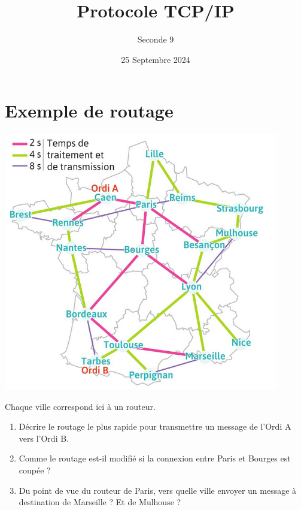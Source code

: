 \documentclass{article}
\title{Protocole TCP/IP}
\date{25 Septembre 2024}
\author{Seconde 9}
\begin{document}
\section*{Exemple de routage}
\begin{center}
\includegraphics[width=0.9\textwidth]{Routage.png}
\end{center}

Chaque ville correspond ici à un routeur.

\begin{enumerate}[label=\emph{\alph*)}]
\item Décrire le routage le plus rapide pour transmettre un message de l'Ordi A vers l'Ordi B.

\emptybox{2cm}
\item Comme le routage est-il modifié si la connexion entre Paris et Bourges est coupée ?

\emptybox{2cm}
\item Du point de vue du routeur de Paris, vers quelle ville envoyer un message à destination de Marseille ? Et de Mulhouse ?

\emptybox{2cm}
\end{enumerate}
\end{document}

